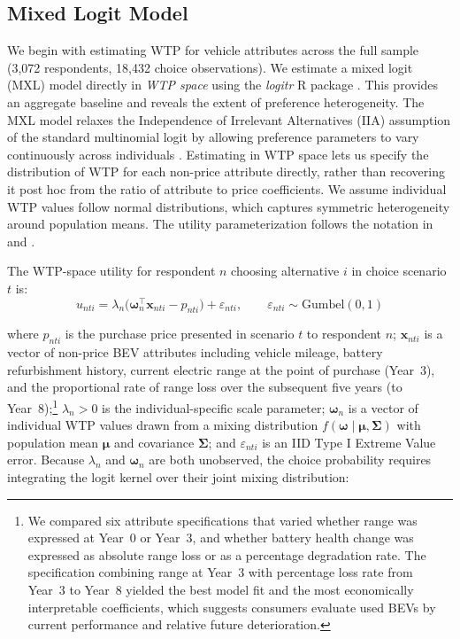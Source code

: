 \documentclass[a4paper,fleqn]{cas-sc}   %
\begin{document}
\subsection{Mixed Logit Model}

We begin with estimating WTP for vehicle attributes across the full sample (3,072 respondents, 18,432 choice observations). We estimate a mixed logit (MXL) model directly in \textit{WTP space} using the \textit{logitr} R package \parencite{helvestonLogitrFastEstimation2023}. This provides an aggregate baseline and reveals the extent of preference heterogeneity. The MXL model relaxes the Independence of Irrelevant Alternatives (IIA) assumption of the standard multinomial logit by allowing preference parameters to vary continuously across individuals \parencite{mcfaddenMixedMNLModels2000, trainDiscreteChoiceMethods2009}. Estimating in WTP space lets us specify the distribution of WTP for each non-price attribute directly, rather than recovering it post hoc from the ratio of attribute to price coefficients. We assume individual WTP values follow normal distributions, which captures symmetric heterogeneity around population means. The utility parameterization follows the notation in \textcite{helvestonPoolingStatedRevealed2018} and \textcite{helvestonLogitrFastEstimation2023}.

The WTP-space utility for respondent $n$ choosing alternative $i$ in choice scenario $t$ is:
\begin{equation}
    u_{nti} = \lambda_n \bigl(\boldsymbol{\omega}_n^{\top} \mathbf{x}_{nti} - p_{nti}\bigr) + \varepsilon_{nti}, \qquad \varepsilon_{nti} \sim \mathrm{Gumbel}(0,1)
    \label{eq:mxl_utility}
\end{equation}

\noindent where $p_{nti}$ is the purchase price presented in scenario $t$ to respondent $n$; $\mathbf{x}_{nti}$ is a vector of non-price BEV attributes including vehicle mileage, battery refurbishment history, current electric range at the point of purchase (Year~3), and the proportional rate of range loss over the subsequent five years (to Year~8);\footnote{We compared six attribute specifications that varied whether range was expressed at Year~0 or Year~3, and whether battery health change was expressed as absolute range loss or as a percentage degradation rate. The specification combining range at Year~3 with percentage loss rate from Year~3 to Year~8 yielded the best model fit and the most economically interpretable coefficients, which suggests consumers evaluate used BEVs by current performance and relative future deterioration.} $\lambda_n > 0$ is the individual-specific scale parameter; $\boldsymbol{\omega}_n$ is a vector of individual WTP values drawn from a mixing distribution $f(\boldsymbol{\omega} \mid \boldsymbol{\mu}, \boldsymbol{\Sigma})$ with population mean $\boldsymbol{\mu}$ and covariance $\boldsymbol{\Sigma}$; and $\varepsilon_{nti}$ is an IID Type I Extreme Value error. Because $\lambda_n$ and $\boldsymbol{\omega}_n$ are both unobserved, the choice probability requires integrating the logit kernel over their joint mixing distribution:
\end{document}
